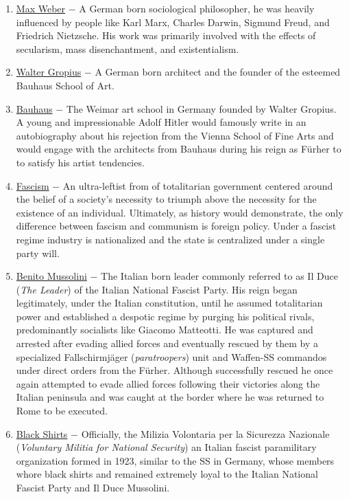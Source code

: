 \documentclass[12pt]{article}
\begin{document}
\begin{flushleft}
\begin{enumerate}
\item \underline{Max Weber} $-$ A German born sociological philosopher, he was heavily influenced by people like Karl Marx, Charles Darwin, Sigmund Freud, and Friedrich Nietzsche. His work was primarily involved with the effects of secularism, mass disenchantment, and existentialism.

\item \underline{Walter Gropius} $-$ A German born architect and the founder of the esteemed Bauhaus School of Art.

\item \underline{Bauhaus} $-$ The Weimar art school in Germany founded by Walter Gropius. A young and impressionable Adolf Hitler would famously write in an autobiography about his rejection from the Vienna School of Fine Arts and would engage with the architects from Bauhaus during his reign as F\"urher to to satisfy his artist tendencies.

\item \underline{Fascism} $-$ An ultra-leftist from of totalitarian government centered around the belief of a society's necessity to triumph above the necessity for the existence of an individual. Ultimately, as history would demonstrate, the only difference between fascism and communism is foreign policy. Under a fascist regime industry is nationalized and the state is centralized under a single party will.

\item \underline{Benito Mussolini} $-$ The Italian born leader commonly referred to as Il Duce (\emph{The Leader}) of the Italian National Fascist Party. His reign began legitimately, under the Italian constitution, until he assumed totalitarian power and established a despotic regime by purging his political rivals, predominantly socialists like Giacomo Matteotti. He was captured and arrested after evading allied forces and eventually rescued by them by a specialized Fallschirmj\"ager (\emph{paratroopers}) unit and Waffen-SS commandos under direct orders from the F\"urher. Although successfully rescued he once again attempted to evade allied forces following their victories along the Italian peninsula and was caught at the border where he was returned to Rome to be executed.

\item \underline{Black Shirts} $-$ Officially, the Milizia Volontaria per la Sicurezza Nazionale (\emph{Voluntary Militia for National Security}) an Italian fascist paramilitary organization formed in 1923, similar to the SS in Germany, whose members whore black shirts and remained extremely loyal to the Italian National Fascist Party and Il Duce Mussolini. 


\end{enumerate}
\end{flushleft}
\end{document}
